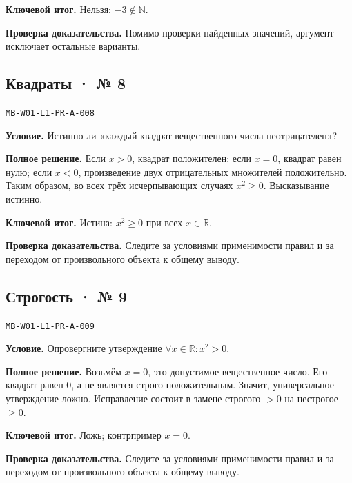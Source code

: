 \documentclass[11pt,a4paper,openany]{book}
\newcommand{\muid}[1]{\texttt{\footnotesize #1}}
\begin{document}
\begin{learnbox}\textbf{Ключевой итог.} Нельзя: $-3\notin\mathbb N$.\par \textbf{Проверка доказательства.} 
Помимо проверки найденных значений, аргумент исключает остальные варианты. 
\end{learnbox}

\subsection*{Квадраты · № 8}\hypertarget{solution:MB-W01-L1-PR-A-008}{}

\muid{MB-W01-L1-PR-A-008}\par

\textbf{Условие.} Истинно ли «каждый квадрат вещественного числа неотрицателен»?\par

\textbf{Полное решение.} Если $x>0$, квадрат положителен; если $x=0$, квадрат равен нулю; если $x<0$, произведение двух отрицательных множителей положительно. Таким образом, во всех трёх исчерпывающих случаях $x^2\ge0$. Высказывание истинно.


\begin{learnbox}\textbf{Ключевой итог.} Истина: $x^2\ge0$ при всех $x\in\mathbb R$.\par \textbf{Проверка доказательства.} 
Следите за условиями применимости правил и за переходом от произвольного объекта к общему выводу. 
\end{learnbox}

\subsection*{Строгость · № 9}\hypertarget{solution:MB-W01-L1-PR-A-009}{}

\muid{MB-W01-L1-PR-A-009}\par

\textbf{Условие.} Опровергните утверждение $\forall x\in\mathbb R\colon x^2>0$.\par

\textbf{Полное решение.} Возьмём $x=0$, это допустимое вещественное число. Его квадрат равен $0$, а не является строго положительным. Значит, универсальное утверждение ложно. Исправление состоит в замене строгого $>0$ на нестрогое $\ge0$.


\begin{learnbox}\textbf{Ключевой итог.} Ложь; контрпример $x=0$.\par \textbf{Проверка доказательства.} 
Следите за условиями применимости правил и за переходом от произвольного объекта к общему выводу. 
\end{learnbox}
\end{document}
